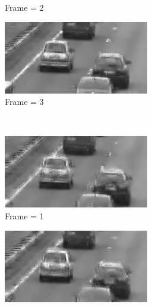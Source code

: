 \documentclass[a4paper, landscape]{article}
\begin{document}
\begin{figure}[H]
\begin{subfigure}{0.13\linewidth}
		\caption{Frame = 2}
	\end{subfigure}
	\begin{subfigure}{0.13\linewidth}
		\centering
		\includegraphics[width=\linewidth]{cars/reconstructed, T = 3, frame = 3.png}
		\caption{Frame = 3}
	\end{subfigure}\\
	\begin{subfigure}{0.13\linewidth}
		\centering
		\includegraphics[width=\linewidth]{cars/reconstructed, T = 5, frame = 1.png}
		\caption{Frame = 1}
	\end{subfigure}
	\begin{subfigure}{0.13\linewidth}
		\centering
		\includegraphics[width=\linewidth]{cars/reconstructed, T = 5, frame = 2.png}

\end{subfigure}
\end{figure}
\end{document}
